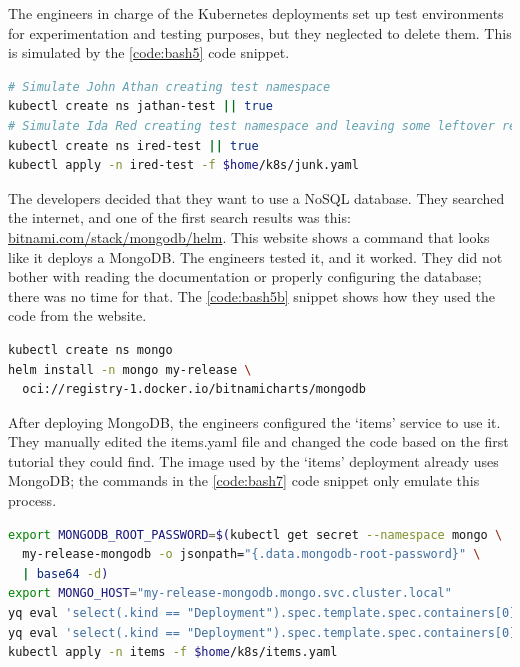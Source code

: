 The engineers in charge of the Kubernetes deployments set up test environments for experimentation and testing purposes, but they neglected to delete them. This is simulated by the \ref{code:bash5} code snippet.

\begin{lstlisting}[caption={Simulate leftover resources},language=bash,label=code:bash5]
# Simulate John Athan creating test namespace
kubectl create ns jathan-test || true
# Simulate Ida Red creating test namespace and leaving some leftover resources in it
kubectl create ns ired-test || true
kubectl apply -n ired-test -f $home/k8s/junk.yaml
\end{lstlisting}

The developers decided that they want to use a NoSQL database. They searched the internet, and one of the first search results was this: \url{bitnami.com/stack/mongodb/helm}. This website shows a command that looks like it deploys a MongoDB. The engineers tested it, and it worked. They did not bother with reading the documentation or properly configuring the database; there was no time for that. The \ref{code:bash5b} snippet shows how they used the code from the website.

\begin{lstlisting}[caption={Deploy MongoDB},language=bash,label=code:bash5b]
kubectl create ns mongo
helm install -n mongo my-release \
  oci://registry-1.docker.io/bitnamicharts/mongodb
\end{lstlisting}

After deploying MongoDB, the engineers configured the `items' service to use it. They manually edited the items.yaml file and changed the code based on the first tutorial they could find. The image used by the `items' deployment already uses MongoDB; the commands in the \ref{code:bash7} code snippet only emulate this process.

\begin{lstlisting}[caption={Configuring the `items' app to use MongoDB},language=bash,label=code:bash7]
export MONGODB_ROOT_PASSWORD=$(kubectl get secret --namespace mongo \
  my-release-mongodb -o jsonpath="{.data.mongodb-root-password}" \
  | base64 -d)
export MONGO_HOST="my-release-mongodb.mongo.svc.cluster.local"
yq eval 'select(.kind == "Deployment").spec.template.spec.containers[0].env[0].value = env(MONGODB_ROOT_PASSWORD)' $home/k8s/items.yaml -i
yq eval 'select(.kind == "Deployment").spec.template.spec.containers[0].env[1].value = env(MONGO_HOST)' $home/k8s/items.yaml -i
kubectl apply -n items -f $home/k8s/items.yaml
\end{lstlisting}

